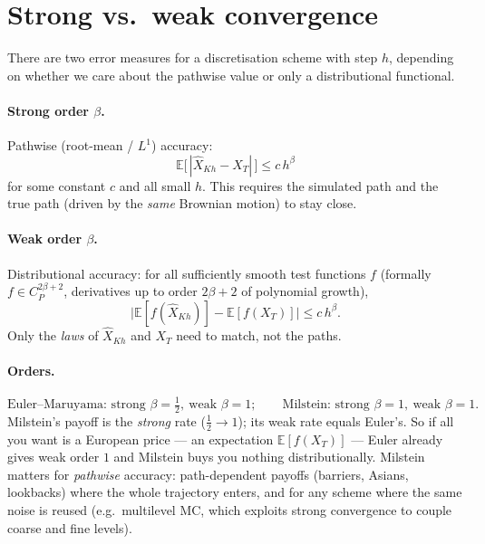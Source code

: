 \documentclass[11pt]{article}
\newcommand{\E}{\mathbb{E}}
\begin{document}
\section{Strong vs.\ weak convergence}

There are two error measures for a discretisation scheme with step $h$, depending on
whether we care about the pathwise value or only a distributional functional.

\paragraph{Strong order $\beta$.} Pathwise (root-mean / $L^1$) accuracy:
\[
\E\bigl[\,|\widehat X_{Kh}-X_T|\,\bigr]\le c\,h^\beta
\]
for some constant $c$ and all small $h$. This requires the simulated path and the true
path (driven by the \emph{same} Brownian motion) to stay close.

\paragraph{Weak order $\beta$.} Distributional accuracy: for all sufficiently smooth
test functions $f$ (formally $f\in C_P^{2\beta+2}$, derivatives up to order $2\beta+2$
of polynomial growth),
\[
\bigl|\E[f(\widehat X_{Kh})]-\E[f(X_T)]\bigr|\le c\,h^\beta.
\]
Only the \emph{laws} of $\widehat X_{Kh}$ and $X_T$ need to match, not the paths.

\paragraph{Orders.}
\[
\text{Euler--Maruyama: strong }\beta=\tfrac12,\ \text{weak }\beta=1;\qquad
\text{Milstein: strong }\beta=1,\ \text{weak }\beta=1.
\]
Milstein's payoff is the \emph{strong} rate ($\tfrac12\to1$); its weak rate equals
Euler's. So if all you want is a European price --- an expectation $\E[f(X_T)]$ --- Euler
already gives weak order $1$ and Milstein buys you nothing distributionally. Milstein
matters for \emph{pathwise} accuracy: path-dependent payoffs (barriers, Asians,
lookbacks) where the whole trajectory enters, and for any scheme where the same noise is
reused (e.g.\ multilevel MC, which exploits strong convergence to couple coarse and fine
levels).
\end{document}
